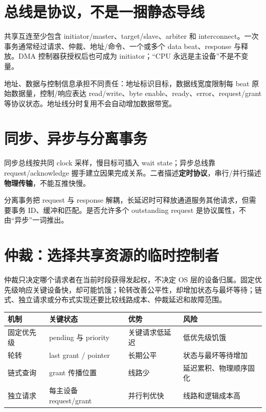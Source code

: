 \documentclass[UTF8,fontset=fandol,11pt,a4paper]{ctexart}
\newcommand{\kw}[1]{\textbf{\color{deep}#1}}
\begin{document}
\tableofcontents
\newpage

\section{总线是协议，不是一捆静态导线}
共享互连至少包含 initiator/master、target/slave、arbiter 和 interconnect。一次事务通常经过请求、仲裁、地址/命令、一个或多个 data beat、response 与释放。DMA 控制器获授权后也可成为 initiator；“CPU 永远是主设备”不是不变量。

地址、数据与控制信息承担不同责任：地址标识目标，数据线宽度限制每 beat 原始数据量，控制/响应表达 read/write、byte enable、ready、error、request/grant 等协议状态。地址线分时复用不会自动增加数据带宽。

\section{同步、异步与分离事务}
同步总线按共同 clock 采样，慢目标可插入 wait state；异步总线靠 request/acknowledge 握手建立因果完成关系。二者描述\kw{定时协议}，串行/并行描述\kw{物理传输}，不能互推快慢。

分离事务把 request 与 response 解耦，长延迟时可释放通道服务其他请求，但需要事务 ID、缓冲和匹配。是否允许多个 outstanding request 是协议属性，不由“异步”一词推出。

\section{仲裁：选择共享资源的临时控制者}
仲裁只决定哪个请求者在当前时段获得发起权，不决定 OS 层的设备归属。固定优先级响应关键设备快，却可能饥饿；轮转改善公平性，却增加状态与最坏等待；链式、独立请求或分布式实现还要比较线路成本、仲裁延迟和故障范围。

\begin{center}\small
\begin{tabularx}{\linewidth}{L{2.2cm}YYY}\toprule
机制 & 关键状态 & 优势 & 风险\\\midrule
固定优先级 & pending 与 priority & 关键请求低延迟 & 低优先级饥饿\\
轮转 & last grant / pointer & 长期公平 & 状态与最坏等待增加\\
链式查询 & grant 传播位置 & 线路少 & 延迟累积、物理顺序固化\\
独立请求 & 每主设备 request/grant & 并行判优快 & 线路和逻辑成本高\\
\bottomrule
\end{tabularx}
\end{center}
\end{document}
